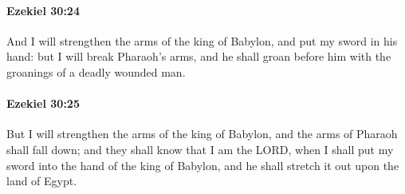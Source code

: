 		\paragraph{Ezekiel 30:24} %
			\label{EZEKIEL-30-24}

			And I will strengthen the arms of the king of Babylon, and put my sword in his hand: but I will break Pharaoh’s arms, and he shall groan before him with the groanings of a deadly wounded man.


		\paragraph{Ezekiel 30:25} %
			\label{EZEKIEL-30-25}

			But I will strengthen the arms of the king of Babylon, and the arms of Pharaoh shall fall down; and they shall know that I am the LORD, when I shall put my sword into the hand of the king of Babylon, and he shall stretch it out upon the land of Egypt.

